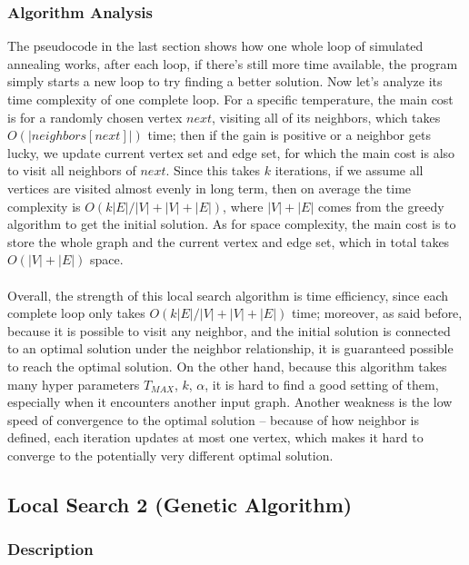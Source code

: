 \documentclass[acmlarge]{acmart}
\begin{document}
\subsubsection{Algorithm Analysis}

The pseudocode in the last section shows how one whole loop of simulated annealing works, after each loop, if there's still more time available, the program simply starts a new loop to try finding a better solution. Now let's analyze its time complexity of one complete loop. For a specific temperature, the main cost is for a randomly chosen vertex $next$, visiting all of its neighbors, which takes $O(|neighbors[next]|)$ time; then if the gain is positive or a neighbor gets lucky, we update current vertex set and edge set, for which the main cost is also to visit all neighbors of $next$. Since this takes $k$ iterations, if we assume all vertices are visited almost evenly in long term, then on average the time complexity is $O(k|E|/|V| + |V| + |E|)$, where $|V|+|E|$ comes from the greedy algorithm to get the initial solution. As for space complexity, the main cost is to store the whole graph and the current vertex and edge set, which in total takes $O(|V|+|E|)$ space.\\\\

Overall, the strength of this local search algorithm is time efficiency, since each complete loop only takes $O(k|E|/|V| + |V| + |E|)$ time; moreover, as said before, because it is possible to visit any neighbor, and the initial solution is connected to an optimal solution under the neighbor relationship, it is guaranteed possible to reach the optimal solution. On the other hand, because this algorithm takes many hyper parameters $T_{MAX}$, $k$, $\alpha$, it is hard to find a good setting of them, especially when it encounters another input graph. Another weakness is the low speed of convergence to the optimal solution -- because of how neighbor is defined, each iteration updates at most one vertex, which makes it hard to converge to the potentially very different optimal solution.

\subsection{Local Search 2 (Genetic Algorithm)}

\subsubsection{Description}
\end{document}
